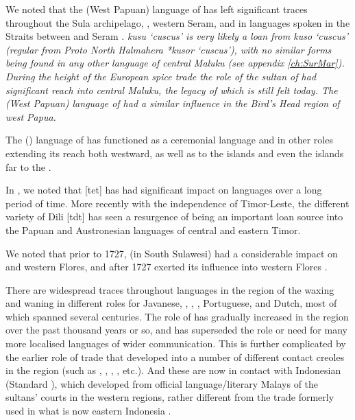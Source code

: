We noted that the  (West Papuan) language
of  has left significant traces throughout the Sula archipelago,
, western Seram, and in languages spoken in the  Straits
between  and Seram \citep{Collins1982b,Grimes1993}.
  \it{kusu} ‘cuscus’ is very likely a  loan
from \it{kuso} ‘cuscus’ (regular from Proto North Halmahera *kusor
‘cuscus’), with no similar forms being found in any other language of central
Maluku (see appendix \ref{ch:SurMar}).
During the height of the European spice trade the role of the
sultan of  had significant reach into central Maluku,
the legacy of which is still felt today.
The  (West Papuan) language of  had
a similar influence in the Bird’s Head region of west Papua.

The  () language of 
has functioned as a ceremonial language
and in other roles extending its reach both westward,
as well as to the  islands
and even the  islands far to the  \citep[400, note 13]{Taber1993}.

In , we noted that  [tet] has had significant
impact on  languages over a long period of time.
More recently with the independence of Timor-Leste,
the different variety of  Dili [tdt] has seen a resurgence
of being an important loan source into the Papuan
and Austronesian languages of central and eastern Timor.

We noted that prior to 1727,
 (in South Sulawesi) had a considerable impact on 
and western Flores, and after 1727  exerted its influence
into western Flores \citep{VerheijenGrimes1995}.

There are widespread traces throughout languages in the region
of the waxing and waning in different roles for Javanese,
, , , Portuguese,
and Dutch, most of which spanned several centuries.
The role of  has gradually increased in the region over
the past thousand years or so,
and has superseded the role or need for many more localised languages of wider communication.
This is further complicated by the earlier role of trade 
that developed into a number of different contact creoles in
the region (such as  ,
 ,  ,  , etc.).
And these are now in contact with Indonesian (Standard ),
which developed from official language/literary Malays of the
sultans’ courts in the western regions,
rather different from the trade  formerly used in what is
now eastern Indonesia \citep{AdelaarPrentice1996,Grimes1991,Grimes1996,Prentice1978}.

